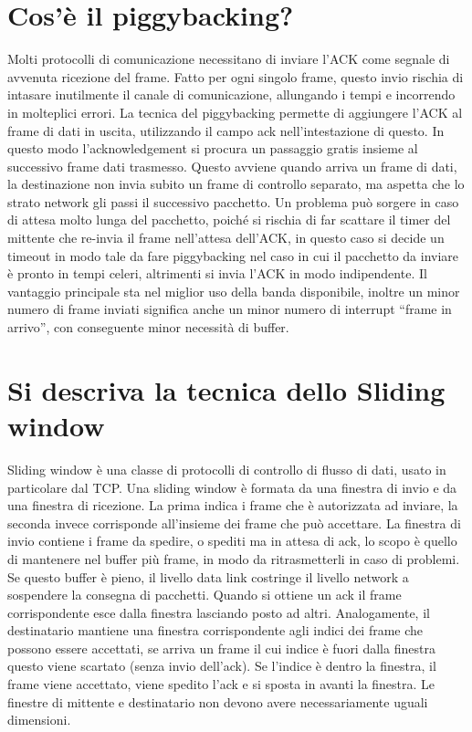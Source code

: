 	     
\section{Cos’è il piggybacking?}

Molti protocolli di comunicazione necessitano di inviare l’ACK come segnale di avvenuta ricezione del frame.
Fatto per ogni singolo frame, questo invio rischia di intasare inutilmente il canale di comunicazione, allungando i tempi e incorrendo in molteplici errori.
La tecnica del piggybacking permette di aggiungere l’ACK al frame di dati in uscita, utilizzando il campo ack nell’intestazione di questo. In questo modo l’acknowledgement si procura un passaggio gratis insieme al successivo frame dati trasmesso.
Questo avviene quando arriva un frame di dati, la destinazione non invia subito un frame di controllo separato, ma aspetta che lo strato network gli passi il successivo pacchetto.
Un problema può sorgere in caso di attesa molto lunga del pacchetto, poiché si rischia di far scattare il timer del mittente che re-invia il frame nell’attesa dell’ACK, in questo caso si decide un timeout in modo tale da fare piggybacking nel caso in cui il pacchetto da inviare è pronto in tempi celeri, altrimenti si invia l’ACK in modo indipendente.
Il vantaggio principale sta nel miglior uso della banda disponibile, inoltre un minor numero di frame inviati significa anche un minor numero di interrupt “frame in arrivo”, con conseguente minor necessità di buffer.

\section{Si descriva la tecnica dello Sliding window}

Sliding window è una classe di protocolli di controllo di flusso di dati, usato in particolare dal TCP.
Una sliding window è formata da una finestra di invio e da una finestra di ricezione. La prima indica i frame che è autorizzata ad inviare, la seconda invece corrisponde all’insieme dei frame che può accettare.
La finestra di invio contiene i frame da spedire, o spediti ma in attesa di ack, lo scopo è quello di mantenere nel buffer più frame, in modo da ritrasmetterli in caso di problemi. Se questo buffer è pieno, il livello data link costringe il livello network a sospendere la consegna di pacchetti. Quando si ottiene un ack il frame corrispondente esce dalla finestra lasciando posto ad altri.
Analogamente, il destinatario mantiene una finestra corrispondente agli indici dei frame che possono essere accettati, se arriva un frame il cui indice è fuori dalla finestra questo viene scartato (senza invio dell’ack). Se l’indice è dentro la finestra, il frame viene accettato, viene spedito l’ack e si sposta in avanti la finestra.
Le finestre di mittente e destinatario non devono avere necessariamente uguali dimensioni.
 
